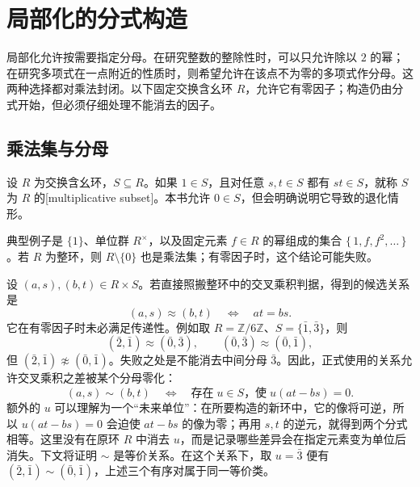 
\section{局部化的分式构造}
\label{b1:sec:1302}

局部化允许按需要指定分母。在研究整数的整除性时，可以只允许除以 \(2\) 的幂；在研究多项式在一点附近的性质时，则希望允许在该点不为零的多项式作分母。这两种选择都对乘法封闭。以下固定交换含幺环 \(R\)，允许它有零因子；构造仍由分式开始，但必须仔细处理不能消去的因子。

%
%

\subsection{乘法集与分母}
\label{b1:subsec:1302:01}

\begin{definition}\label{b1:def:multiplicative-set}
	设 \(R\) 为交换含幺环，\(S\subseteq R\)。如果 \(1\in S\)，且对任意 \(s,t\in S\) 都有 \(st\in S\)，就称 \(S\) 为 \(R\) 的[multiplicative subset]。本书允许 \(0\in S\)，但会明确说明它导致的退化情形。
\end{definition}
典型例子是 \(\{1\}\)、单位群 \(R^\times\)，以及固定元素 \(f\in R\) 的幂组成的集合 \(\{\,1,f,f^2,\ldots\,\}\)。若 \(R\) 为整环，则 \(R\setminus\{0\}\) 也是乘法集；有零因子时，这个结论可能失败。

\ProseParagraphBreak
设 \((a,s),(b,t)\in R\times S\)。若直接照搬整环中的交叉乘积判据，得到的候选关系是
\[
	(a,s)\approx(b,t)\quad\Longleftrightarrow\quad at=bs.
\]
它在有零因子时未必满足传递性。例如取 \(R=\mathbb Z/6\mathbb Z\)、\(S=\{\bar1,\bar3\}\)，则
\[
	(\bar2,\bar1)\approx(\bar0,\bar3),\qquad (\bar0,\bar3)\approx(\bar0,\bar1),
\]
但 \((\bar2,\bar1)\not\approx(\bar0,\bar1)\)。失败之处是不能消去中间分母 \(\bar3\)。因此，正式使用的关系允许交叉乘积之差被某个分母零化：
\begin{equation}\label{b1:eq:localization-equivalence}
	(a,s)\sim(b,t) \quad\Longleftrightarrow\quad \text{存在}\;u\in S\text{，使}\;u(at-bs)=0.
\end{equation}
额外的 \(u\) 可以理解为一个“未来单位”：在所要构造的新环中，它的像将可逆，所以 \(u(at-bs)=0\) 会迫使 \(at-bs\) 的像为零；再用 \(s,t\) 的逆元，就得到两个分式相等。这里没有在原环 \(R\) 中消去 \(u\)，而是记录哪些差异会在指定元素变为单位后消失。下文将证明 \(\sim\) 是等价关系。在这个关系下，取 \(u=\bar3\) 便有 \((\bar2,\bar1)\sim(\bar0,\bar1)\)，上述三个有序对属于同一等价类。

